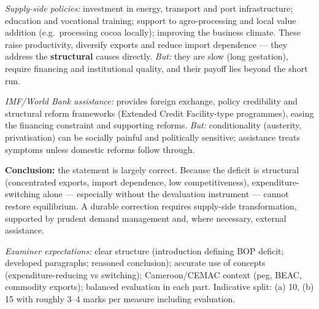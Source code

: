 \documentclass[11pt]{article}
\begin{document}
\begin{corrige}
\emph{Supply-side policies:} investment in energy, transport and port infrastructure; education and vocational training; support to agro-processing and local value addition (e.g.\ processing cocoa locally); improving the business climate. These raise productivity, diversify exports and reduce import dependence — they address the \textbf{structural} causes directly. \emph{But:} they are slow (long gestation), require financing and institutional quality, and their payoff lies beyond the short run.

\emph{IMF/World Bank assistance:} provides foreign exchange, policy credibility and structural reform frameworks (Extended Credit Facility-type programmes), easing the financing constraint and supporting reforms. \emph{But:} conditionality (austerity, privatisation) can be socially painful and politically sensitive; assistance treats symptoms unless domestic reforms follow through.

\textbf{Conclusion:} the statement is largely correct. Because the deficit is structural (concentrated exports, import dependence, low competitiveness), expenditure-switching alone — especially without the devaluation instrument — cannot restore equilibrium. A durable correction requires supply-side transformation, supported by prudent demand management and, where necessary, external assistance.

\emph{Examiner expectations:} clear structure (introduction defining BOP deficit; developed paragraphs; reasoned conclusion); accurate use of concepts (expenditure-reducing vs switching); Cameroon/CEMAC context (peg, BEAC, commodity exports); balanced evaluation in each part. Indicative split: (a) 10, (b) 15 with roughly 3--4 marks per measure including evaluation.
\end{corrige}
\end{document}
